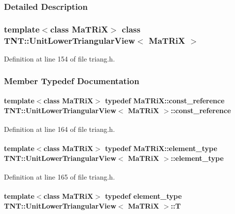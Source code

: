 \subsubsection{Detailed Description}
\subsubsection*{template$<$class MaTRiX$>$ class TNT::UnitLowerTriangularView$<$ MaTRiX $>$}



Definition at line 154 of file triang.h.



\subsubsection{Member Typedef Documentation}
\paragraph[{const\_\-reference}]{\setlength{\rightskip}{0pt plus 5cm}template$<$class MaTRiX$>$ typedef MaTRiX::const\_\-reference {\bf TNT::UnitLowerTriangularView}$<$ MaTRiX $>$::{\bf const\_\-reference}}\hfill\label{class_t_n_t_1_1_unit_lower_triangular_view_a7792363220cbf3c2d5264a01f66b4c70}


Definition at line 164 of file triang.h.

\paragraph[{element\_\-type}]{\setlength{\rightskip}{0pt plus 5cm}template$<$class MaTRiX$>$ typedef MaTRiX::element\_\-type {\bf TNT::UnitLowerTriangularView}$<$ MaTRiX $>$::{\bf element\_\-type}}\hfill\label{class_t_n_t_1_1_unit_lower_triangular_view_aa07ec709dc10cc1a022bfabbf6dfebd5}


Definition at line 165 of file triang.h.

\paragraph[{T}]{\setlength{\rightskip}{0pt plus 5cm}template$<$class MaTRiX$>$ typedef {\bf element\_\-type} {\bf TNT::UnitLowerTriangularView}$<$ MaTRiX $>$::{\bf T}}\hfill\label{class_t_n_t_1_1_unit_lower_triangular_view_aae2b7bbd9893cb1b1b2152ba1bab4111}


